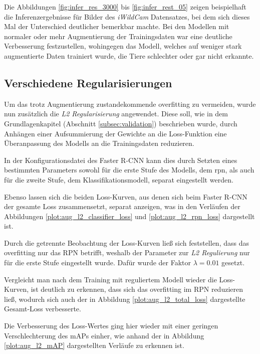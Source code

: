 Die Abbildungen \ref{fig:infer_res_3000} bis \ref{fig:infer_rest_05}
zeigen beispielhaft die Inferenzergebnisse für Bilder des 
\textit{iWildCam} Datensatzes, bei dem sich dieses Mal der 
Unterschied deutlicher bemerkbar machte.
Bei den Modellen mit normaler oder mehr Augmentierung der 
Trainingsdaten war eine deutliche Verbesserung festzustellen, 
wohingegen das Modell, welches auf weniger stark augmentierte 
Daten trainiert wurde, die Tiere schlechter oder gar nicht erkannte.


\subsection{Verschiedene Regularisierungen}

Um das trotz Augmentierung zustandekommende \Gls{overfitting} zu 
vermeiden, wurde nun zusätzlich die \textit{L2 Regularisierung}
angewendet.
Diese soll, wie in dem Grundlagenkapitel (Abschnitt \ref{subsec:validation})
beschrieben wurde, durch Anhängen einer Aufsummierung der Gewichte
an die Loss-Funktion eine Überanpassung des Modells an die
Trainingsdaten reduzieren.

In der Konfigurationsdatei des Faster R-CNN kann dies
durch Setzten eines bestimmten Parameters sowohl für die
erste Stufe des Modells, dem \Gls{rpn},
als auch für die zweite Stufe, dem Klassifikationsmodell,
separat eingestellt werden.

Ebenso lassen sich die beiden Loss-Kurven, aus denen sich 
beim Faster R-CNN der gesamte Loss zusammensetzt,
separat anzeigen, was in den Verläufen der 
Abbildungen \ref{plot:aug_l2_classifier_loss}
und \ref{plot:aug_l2_rpn_loss} dargestellt ist.

Durch die getrennte Beobachtung der Loss-Kurven ließ sich 
feststellen, dass das \Gls{overfitting} nur das RPN betrifft,
weshalb der Parameter zur \textit{L2 Regulierung} nur 
für die erste Stufe eingestellt wurde.
Dafür wurde der Faktor $\lambda = 0.01$ gesetzt.

Vergleicht man nach dem Training mit 
reguliertem Modell wieder die Loss-Kurven, ist deutlich zu 
erkennen, dass sich das \Gls{overfitting} im RPN 
reduzieren ließ, wodurch sich auch der
in Abbildung \ref{plot:aug_l2_total_loss} 
dargestellte Gesamt-Loss verbesserte.

Die Verbesserung des Loss-Wertes 
ging hier wieder mit einer geringen 
Verschlechterung des mAPs einher, wie anhand der in Abbildung
\ref{plot:aug_l2_mAP} dargestellten Verläufe zu erkennen ist.

